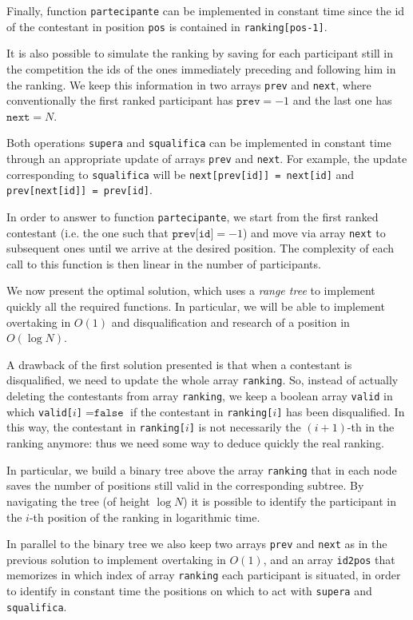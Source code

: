 Finally, function \texttt{partecipante} can be implemented in constant time since the id of the contestant in position \texttt{pos} is contained in \texttt{ranking[pos-1]}.


\Lista
It is also possible to simulate the ranking by saving for each participant still in the competition the ids of the ones immediately preceding and following him in the ranking. We keep this information in two arrays \texttt{prev} and \texttt{next}, where conventionally the first ranked participant has $\texttt{prev} = -1$ and the last one has $\texttt{next} = N$.

Both operations \texttt{supera} and \texttt{squalifica} can be implemented in constant time through an appropriate update of arrays \texttt{prev} and \texttt{next}. For example, the update corresponding to \texttt{squalifica} will be \texttt{next[prev[id]] = next[id]} and \texttt{prev[next[id]] = prev[id]}.

In order to answer to function \texttt{partecipante}, we start from the first ranked contestant (i.e. the one such that $\texttt{prev[id]} = -1$) and move via array \texttt{next} to subsequent ones until we arrive at the desired position. The complexity of each call to this function is then linear in the number of participants.


\RangeTree
We now present the optimal solution, which uses a \emph{range tree} to implement quickly all the required functions. In particular, we will be able to implement overtaking in $O(1)$  and disqualification and research of a position in $O(\log N)$.

A drawback of the first solution presented is that when a contestant is disqualified, we need to update the whole array  \texttt{ranking}. So, instead of actually deleting the contestants from array \texttt{ranking}, we keep a boolean array \texttt{valid} in which \texttt{valid[$i$]}$ = \texttt{false}$ if the contestant in \texttt{ranking[$i$]} has been disqualified. In this way, the contestant in \texttt{ranking[$i$]} is not necessarily the $(i+1)$-th in the ranking anymore: thus we need some way to deduce quickly the real ranking.

In particular, we build a binary tree above the array \texttt{ranking} that in each node saves the number of positions still valid in the corresponding subtree. By navigating the tree (of height $\log N$) it is possible to identify the participant in the $i$-th position of the ranking in logarithmic time.

In parallel to the binary tree we also keep two arrays \texttt{prev} and \texttt{next} as in the previous solution to implement overtaking in $O(1)$, and an array \texttt{id2pos} that memorizes in which index of array \texttt{ranking} each participant is situated, in order to identify in constant time the positions on which to act with \texttt{supera} and \texttt{squalifica}. 


